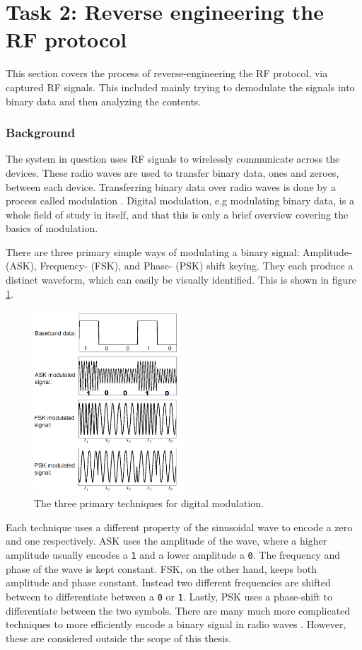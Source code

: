 \section{Task 2: Reverse engineering the RF protocol} \label{ch:pentesting:rf-reverse-engineering}
This section covers the process of reverse-engineering the RF protocol, via captured RF signals. This included mainly trying to demodulate the signals into binary data and then analyzing the contents.

\subsubsection{Background}
The system in question uses RF signals to wirelessly communicate across the devices. These radio waves are used to transfer binary data, ones and zeroes, between each device. Transferring binary data over radio waves is done by a process called modulation \cite{rf-modulation}. Digital modulation, e.g modulating binary data, is a whole field of study in itself, and that this is only a brief overview covering the basics of modulation.

There are three primary simple ways of modulating a binary signal: Amplitude- (ASK), Frequency- (FSK), and Phase- (PSK) shift keying. They each produce a distinct waveform, which can easily be visually identified. This is shown in figure \ref{fig:digital-modulation}.
\begin{figure}[!ht]
    \centering
    \includegraphics[width=0.5\textwidth]{images/6-pentesting/digital-modulation.png}
    \caption{The three primary techniques for digital modulation.}
    \label{fig:digital-modulation}
\end{figure}
Each technique uses a different property of the sinusoidal wave to encode a zero and one respectively. \gls{ASK} uses the amplitude of the wave, where a higher amplitude usually encodes a \texttt{1} and a lower amplitude a \texttt{0}. The frequency and phase of the wave is kept constant. \gls{FSK}, on the other hand, keeps both amplitude and phase constant. Instead two different frequencies are shifted between to differentiate between a \texttt{0} or \texttt{1}. Lastly, \gls{PSK} uses a phase-shift to differentiate between the two symbols. There are many much more complicated techniques to more efficiently encode a binary signal in radio waves \cite{rf-modulation}. However, these are considered outside the scope of this thesis.

